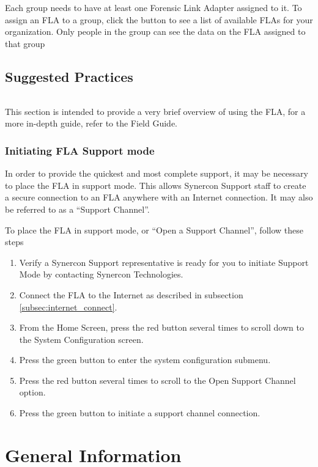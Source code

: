 \documentclass[11pt, oneside]{book}
\begin{document}
Each group needs to have at least one Forensic Link Adapter assigned
to it. To assign an FLA to a group, click the button to see a list
of available FLAs for your organization. Only people in the group
can see the data on the FLA assigned to that group


\chapter{Suggested Practices}
\paragraph{  }
This section is intended to provide a very brief overview of using
the FLA, for a more in-depth guide, refer to the Field Guide.


\section{Initiating FLA Support mode}

In order to provide the quickest and most complete support, it may
be necessary to place the FLA in support mode. This allows Synercon
Support staff to create a secure connection to an FLA anywhere with
an Internet connection. It may also be referred to as a ``Support
Channel''.

To place the FLA in support mode, or ``Open a Support Channel'',
follow these steps
\begin{enumerate}
\item Verify a Synercon Support representative is ready for you to initiate
Support Mode by contacting Synercon Technologies.
\item Connect the FLA to the Internet as described in subsection \ref{subsec:internet_connect}.
\item From the Home Screen, press the red button several times to scroll down to the System Configuration screen.
\item Press the green button to enter the system configuration submenu.
\item Press the red button several times to scroll to the Open Support Channel option.
\item Press the green button to initiate a support channel connection.
\end{enumerate}

\part{General Information}
\end{document}
